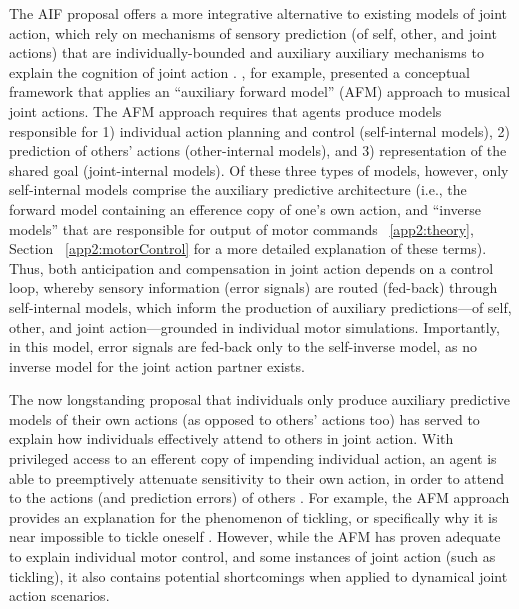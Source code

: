 \begin{CJK}{UTF8}{gbsn}
The AIF proposal offers a more integrative alternative to existing models of joint action, which rely on mechanisms of sensory prediction (of self, other, and joint actions) that are individually-bounded and auxiliary auxiliary mechanisms to explain the cognition of joint action \citep{Pesquita2017}.  \textcite{Keller2016}, for example, presented a conceptual framework that applies an ``auxiliary forward model'' (AFM) approach to musical joint actions.  The AFM approach requires that agents produce models responsible for 1) individual action planning and control (self-internal models), 2) prediction of others' actions (other-internal models), and 3) representation of the shared goal (joint-internal models).  Of these three types of models, however, only self-internal models comprise the auxiliary predictive architecture (i.e., the forward model containing an efference copy of one's own action, and ``inverse models'' that are responsible for output of motor commands ~\ref{app2:theory}, Section ~\ref{app2:motorControl} for a more detailed explanation of these terms).  Thus, both anticipation and compensation in joint action depends on a control loop, whereby sensory information (error signals) are routed (fed-back) through self-internal models, which inform the production of auxiliary predictions---of self, other, and joint action---grounded in individual motor simulations.  Importantly, in this model,  error signals are fed-back only to the self-inverse model, as no inverse model for the joint action partner exists.

The now longstanding proposal that individuals only produce auxiliary predictive models of their own actions (as opposed to others' actions too) has served to explain how individuals effectively attend to others in joint action.  With privileged access to an efferent copy of impending individual action, an agent is able to preemptively attenuate sensitivity to their own action, in order to attend to the actions (and prediction errors) of others \citep{Wolpert1998}.  For example, the AFM approach provides an explanation for the phenomenon of tickling, or specifically why it is near impossible to tickle oneself \citep[due to sensory attenuation resulting from the self-generated predictions about the consequences of action][]{Blakemore2003}. However, while the AFM has proven adequate to explain individual motor control, and some instances of joint action (such as tickling), it also contains potential shortcomings when applied to dynamical joint action scenarios.


\end{CJK}
